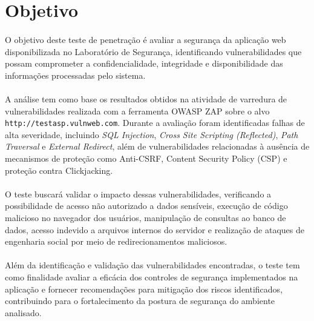 \section{Objetivo}

\paragraph{}
O objetivo deste teste de penetração é avaliar a segurança da aplicação web
disponibilizada no Laboratório de Segurança, identificando vulnerabilidades que
possam comprometer a confidencialidade, integridade e disponibilidade das
informações processadas pelo sistema.

\paragraph{}
A análise tem como base os resultados obtidos na atividade de varredura de
vulnerabilidades realizada com a ferramenta OWASP ZAP sobre o alvo
\texttt{http://testasp.vulnweb.com}. Durante a avaliação foram identificadas
falhas de alta severidade, incluindo \textit{SQL Injection}, \textit{Cross Site
Scripting (Reflected)}, \textit{Path Traversal} e \textit{External Redirect},
além de vulnerabilidades relacionadas à ausência de mecanismos de proteção como
Anti-CSRF, Content Security Policy (CSP) e proteção contra Clickjacking.

\paragraph{}
O teste buscará validar o impacto dessas vulnerabilidades, verificando a
possibilidade de acesso não autorizado a dados sensíveis, execução de código
malicioso no navegador dos usuários, manipulação de consultas ao banco de
dados, acesso indevido a arquivos internos do servidor e realização de ataques
de engenharia social por meio de redirecionamentos maliciosos.

\paragraph{}
Além da identificação e validação das vulnerabilidades encontradas, o teste tem
como finalidade avaliar a eficácia dos controles de segurança implementados na
aplicação e fornecer recomendações para mitigação dos riscos identificados,
contribuindo para o fortalecimento da postura de segurança do ambiente
analisado.

